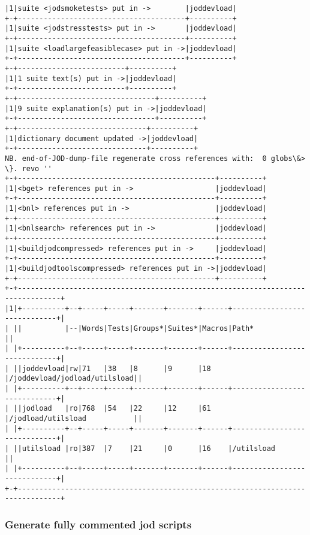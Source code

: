 \documentclass[11pt,letter,landscape]{article}
\begin{document}
\begin{Verbatim}[commandchars=\\\{\}]
|1|suite <jodsmoketests> put in ->        |joddevload|
+-+---------------------------------------+----------+
|1|suite <jodstresstests> put in ->       |joddevload|
+-+---------------------------------------+----------+
|1|suite <loadlargefeasiblecase> put in ->|joddevload|
+-+---------------------------------------+----------+
+-+-------------------------+----------+
|1|1 suite text(s) put in ->|joddevload|
+-+-------------------------+----------+
+-+--------------------------------+----------+
|1|9 suite explanation(s) put in ->|joddevload|
+-+--------------------------------+----------+
+-+------------------------------+----------+
|1|dictionary document updated ->|joddevload|
+-+------------------------------+----------+
NB. end-of-JOD-dump-file regenerate cross references with:  0 globs\&> \}. revo '' 
+-+----------------------------------------------+----------+
|1|<bget> references put in ->                   |joddevload|
+-+----------------------------------------------+----------+
|1|<bnl> references put in ->                    |joddevload|
+-+----------------------------------------------+----------+
|1|<bnlsearch> references put in ->              |joddevload|
+-+----------------------------------------------+----------+
|1|<buildjodcompressed> references put in ->     |joddevload|
+-+----------------------------------------------+----------+
|1|<buildjodtoolscompressed> references put in ->|joddevload|
+-+----------------------------------------------+----------+
+-+--------------------------------------------------------------------------------+
|1|+----------+--+-----+-----+-------+-------+------+-----------------------------+|
| ||          |--|Words|Tests|Groups*|Suites*|Macros|Path*                        ||
| |+----------+--+-----+-----+-------+-------+------+-----------------------------+|
| ||joddevload|rw|71   |38   |8      |9      |18    |/joddevload/jodload/utilsload||
| |+----------+--+-----+-----+-------+-------+------+-----------------------------+|
| ||jodload   |ro|768  |54   |22     |12     |61    |/jodload/utilsload           ||
| |+----------+--+-----+-----+-------+-------+------+-----------------------------+|
| ||utilsload |ro|387  |7    |21     |0      |16    |/utilsload                   ||
| |+----------+--+-----+-----+-------+-------+------+-----------------------------+|
+-+--------------------------------------------------------------------------------+

    \end{Verbatim}

    \subsubsection{Generate fully commented jod
scripts}\label{generate-fully-commented-jod-scripts}
\end{document}
